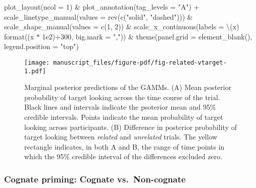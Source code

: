 \documentclass[
  letterpaper,
  DIV=11,
  numbers=noendperiod]{scrartcl}
\newenvironment{Shaded}{\begin{snugshade}}{\end{snugshade}}
\newcommand{\AttributeTok}[1]{\textcolor[rgb]{0.40,0.45,0.13}{#1}}
\newcommand{\DecValTok}[1]{\textcolor[rgb]{0.68,0.00,0.00}{#1}}
\newcommand{\FloatTok}[1]{\textcolor[rgb]{0.68,0.00,0.00}{#1}}
\newcommand{\FunctionTok}[1]{\textcolor[rgb]{0.28,0.35,0.67}{#1}}
\newcommand{\NormalTok}[1]{\textcolor[rgb]{0.00,0.23,0.31}{#1}}
\newcommand{\SpecialCharTok}[1]{\textcolor[rgb]{0.37,0.37,0.37}{#1}}
\newcommand{\StringTok}[1]{\textcolor[rgb]{0.13,0.47,0.30}{#1}}
\begin{document}
\begin{Shaded}
\begin{Highlighting}[]
    \FunctionTok{plot\_layout}\NormalTok{(}\AttributeTok{ncol =} \DecValTok{1}\NormalTok{) }\SpecialCharTok{\&}
    \FunctionTok{plot\_annotation}\NormalTok{(}\AttributeTok{tag\_levels =} \StringTok{"A"}\NormalTok{) }\SpecialCharTok{+}
    \FunctionTok{scale\_linetype\_manual}\NormalTok{(}\AttributeTok{values =} \FunctionTok{rev}\NormalTok{(}\FunctionTok{c}\NormalTok{(}\StringTok{"solid"}\NormalTok{, }\StringTok{"dashed"}\NormalTok{))) }\SpecialCharTok{\&}
    \FunctionTok{scale\_shape\_manual}\NormalTok{(}\AttributeTok{values =} \FunctionTok{c}\NormalTok{(}\DecValTok{1}\NormalTok{, }\DecValTok{2}\NormalTok{)) }\SpecialCharTok{\&}
    \FunctionTok{scale\_x\_continuous}\NormalTok{(}\AttributeTok{labels =}\NormalTok{ \textbackslash{}(x) }\FunctionTok{format}\NormalTok{((x }\SpecialCharTok{*} \FloatTok{1e2}\NormalTok{)}\SpecialCharTok{+}\DecValTok{300}\NormalTok{, }
                                            \AttributeTok{big.mark =} \StringTok{","}\NormalTok{)) }\SpecialCharTok{\&}
    \FunctionTok{theme}\NormalTok{(}\AttributeTok{panel.grid =} \FunctionTok{element\_blank}\NormalTok{(),}
          \AttributeTok{legend.position =} \StringTok{"top"}\NormalTok{) }
\end{Highlighting}
\end{Shaded}

\begin{figure}[H]

{\centering \texttt{[image: manuscript\_files/figure-pdf/fig-related-vtarget-1.pdf]}

}

\caption{\label{fig-related-vtarget}Marginal posterior predictions of
the GAMMs. (A) Mean posterior probability of target looking across the
time course of the trial. Black lines and intervals indicate the
psoterior mean and 95\% credible intervals. Points indicate the mean
probability of target looking across participants. (B) Difference in
posterior probability of target looking between \emph{related} and
\emph{unrelated} trials. The yellow rectangle indicates, in both A and
B, the range of time points in which the 95\% credible interval of the
differences excluded zero.}

\end{figure}

\hypertarget{cognate-priming-cognate-vs.-non-cognate-1}{%
\subsubsection{Cognate priming: Cognate
vs.~Non-cognate}\label{cognate-priming-cognate-vs.-non-cognate-1}}
\end{document}
